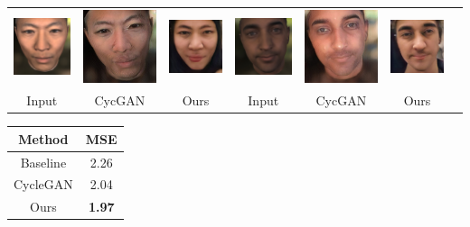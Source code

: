 \documentclass[landscape,a0paper,fontscale=0.285]{baposter} %
\begin{document}
\begin{poster}
{\begin{minipage}[t]{.45\linewidth}
\tiny
\setlength\tabcolsep{1.1pt}
\begin{tabular}{ccccccc}
\includegraphics[width=.16\textwidth]{figures/face/img_g100_t50_000003_crop_real_A.jpg}&
\includegraphics[width=.16\textwidth]{figures/face/img_g100_t50_000003_crop_fake_B_2.jpg}&
\includegraphics[width=.16\textwidth]{figures/face/img_g100_t50_000003_crop_fake_B.jpg}&
\includegraphics[width=.16\textwidth]{figures/face/img_g100_t50_000004_crop_real_A.jpg}&
\includegraphics[width=.16\textwidth]{figures/face/img_g100_t50_000004_crop_fake_B_2.jpg}&
\includegraphics[width=.16\textwidth]{figures/face/img_g100_t50_000004_crop_fake_B.jpg}\\
Input & CycGAN & Ours & Input & CycGAN & Ours \\
\end{tabular}
\end{minipage}
\hspace{0.62cm}
\begin{minipage}[t]{.45\linewidth}
\scriptsize
\setlength\tabcolsep{1pt}
  \begin{tabular}{cc} \hline
  Method & MSE \\ \hline
  Baseline & 2.26  \\
  CycleGAN & 2.04 \\
  Ours &  \textbf{1.97} \\ \hline
  \end{tabular}


\end{minipage}}
\end{poster}
\end{document}
